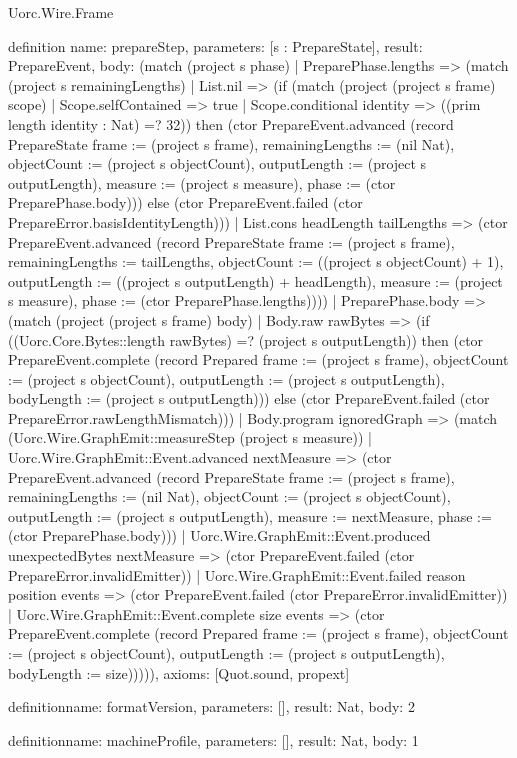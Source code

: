 \begin{lexlean}{Uorc.Wire.Frame}
\begin{semanticmodule}
definition{
  name: prepareStep,
  parameters: [s : PrepareState],
  result: PrepareEvent,
  body: (match (project s phase)
    | PreparePhase.lengths => (match (project s remainingLengths)
      | List.nil => (if (match (project (project s frame) scope)
        | Scope.selfContained => true
        | Scope.conditional identity => ((prim length identity : Nat) =? 32)) then (ctor PrepareEvent.advanced (record PrepareState {frame := (project s frame), remainingLengths := (nil Nat), objectCount := (project s objectCount), outputLength := (project s outputLength), measure := (project s measure), phase := (ctor PreparePhase.body)})) else (ctor PrepareEvent.failed (ctor PrepareError.basisIdentityLength)))
      | List.cons headLength tailLengths => (ctor PrepareEvent.advanced (record PrepareState {frame := (project s frame), remainingLengths := tailLengths, objectCount := ((project s objectCount) + 1), outputLength := ((project s outputLength) + headLength), measure := (project s measure), phase := (ctor PreparePhase.lengths)})))
    | PreparePhase.body => (match (project (project s frame) body)
      | Body.raw rawBytes => (if ((Uorc.Core.Bytes::length rawBytes) =? (project s outputLength)) then (ctor PrepareEvent.complete (record Prepared {frame := (project s frame), objectCount := (project s objectCount), outputLength := (project s outputLength), bodyLength := (project s outputLength)})) else (ctor PrepareEvent.failed (ctor PrepareError.rawLengthMismatch)))
      | Body.program ignoredGraph => (match (Uorc.Wire.GraphEmit::measureStep (project s measure))
        | Uorc.Wire.GraphEmit::Event.advanced nextMeasure => (ctor PrepareEvent.advanced (record PrepareState {frame := (project s frame), remainingLengths := (nil Nat), objectCount := (project s objectCount), outputLength := (project s outputLength), measure := nextMeasure, phase := (ctor PreparePhase.body)}))
        | Uorc.Wire.GraphEmit::Event.produced unexpectedBytes nextMeasure => (ctor PrepareEvent.failed (ctor PrepareError.invalidEmitter))
        | Uorc.Wire.GraphEmit::Event.failed reason position events => (ctor PrepareEvent.failed (ctor PrepareError.invalidEmitter))
        | Uorc.Wire.GraphEmit::Event.complete size events => (ctor PrepareEvent.complete (record Prepared {frame := (project s frame), objectCount := (project s objectCount), outputLength := (project s outputLength), bodyLength := size}))))),
  axioms: [Quot.sound, propext]
}

definition{name: formatVersion, parameters: [], result: Nat, body: 2}

definition{name: machineProfile, parameters: [], result: Nat, body: 1}


\end{semanticmodule}
\end{lexlean}
